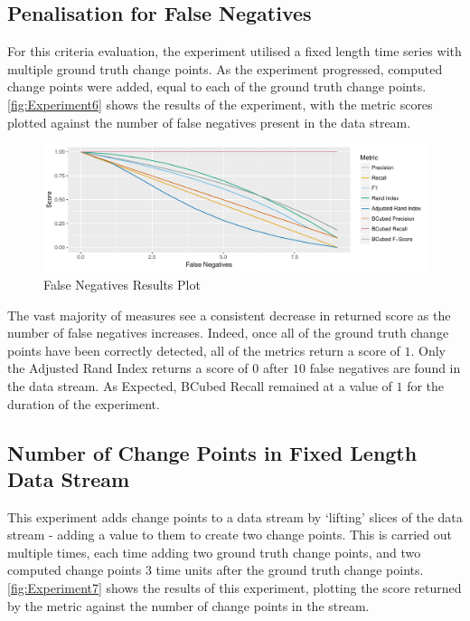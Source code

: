 \documentclass[../main.tex]{subfiles}
\begin{document}
\subsection{Penalisation for False Negatives}

For this criteria evaluation, the experiment utilised a fixed length time series with multiple ground truth change points. As the experiment progressed, computed change points were added, equal to each of the ground truth change points. \autoref{fig:Experiment6} shows the results of the experiment, with the metric scores plotted against the number of false negatives present in the data stream.

\begin{figure}[h]
    \includegraphics[width=\textwidth]{figures/Experiment6}
    \caption{False Negatives Results Plot}
    \label{fig:Experiment6}
\end{figure}

The vast majority of measures see a consistent decrease in returned score as the number of false negatives increases. Indeed, once all of the ground truth change points have been correctly detected, all of the metrics return a score of $1$. Only the Adjusted Rand Index returns a score of $0$ after $10$ false negatives are found in the data stream. As Expected, BCubed Recall remained at a value of $1$ for the duration of the experiment.

\subsection{Number of Change Points in Fixed Length Data Stream}

This experiment adds change points to a data stream by `lifting' slices of the data stream - adding a value to them to create two change points. This is carried out multiple times, each time adding two ground truth change points, and two computed change points 3 time units after the ground truth change points. \autoref{fig:Experiment7} shows the results of this experiment, plotting the score returned by the metric against the number of change points in the stream.
\end{document}
